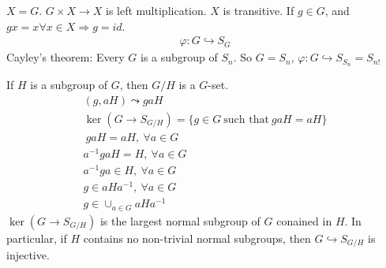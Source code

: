 \documentclass[class=scrartcl, crop=false]{standalone}
\begin{document}
\begin{example}
  $X = G$. $G \times X \to X$ is left multiplication. $X$ is transitive. 
  If $g \in G$, and $gx = x \forall x \in X \Rightarrow g = id$.
  \begin{gather*}
    \varphi: G \hookrightarrow S_G
  \end{gather*} 
  Cayley's theorem: Every $G$ is a subgroup of $S_n$. So $G = S_n$, $\varphi: G \hookrightarrow S_{S_n} = S_{n!}$
\end{example} 
\begin{example}
  If $H$ is a subgroup of $G$, then $G / H$ is a $G$-set. 
  \begin{gather*}
    (g, aH) \leadsto gaH \\
    \ker(G \to S_{G / H}) = \{g \in G \ \text{such that} \ gaH = aH\} \\\
    gaH = aH, \ \forall a \in G \\
    a^{-1}gaH = H, \ \forall a \in G \\
    a^{-1}ga \in H, \ \forall a \in G \\
    g \in aHa^{-1}, \ \forall a \in G \\
    g \in \cup_{a \in G}aHa^{-1}
  \end{gather*} 
  $\ker(G \to S_{G / H})$ is the largest normal subgroup of $G$ conained in $H$. In particular, if $H$ contains no non-trivial normal subgroups, then $G \hookrightarrow S_{G / H}$ is injective.
\end{example} 
\end{document}
